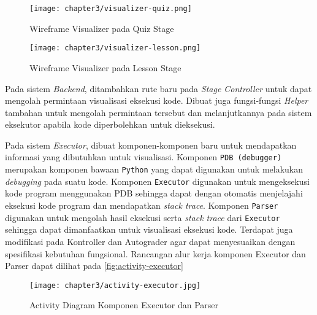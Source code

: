\begin{figure}[H]
  \centering
  \texttt{[image: chapter3/visualizer-quiz.png]}
  \caption{Wireframe Visualizer pada Quiz Stage} \label{fig:wireframe-quiz}
\end{figure}

\begin{figure}[H]
  \centering
  \texttt{[image: chapter3/visualizer-lesson.png]}
  \caption{Wireframe Visualizer pada Lesson Stage} \label{fig:wireframe-lesson}
\end{figure}

Pada sistem \textit{Backend}, ditambahkan rute baru pada \textit{Stage Controller} untuk dapat mengolah permintaan visualisasi eksekusi kode. Dibuat juga fungsi-fungsi \textit{Helper} tambahan untuk mengolah permintaan tersebut dan melanjutkannya pada sistem eksekutor apabila kode diperbolehkan untuk dieksekusi.

Pada sistem \textit{Executor}, dibuat komponen-komponen baru untuk mendapatkan informasi yang dibutuhkan untuk visualisasi. Komponen \verb|PDB (debugger)| merupakan komponen bawaan \verb|Python| yang dapat digunakan untuk melakukan \textit{debugging} pada suatu kode. Komponen \verb|Executor| digunakan untuk mengeksekusi kode program menggunakan PDB sehingga dapat dengan otomatis menjelajahi eksekusi kode program dan mendapatkan \textit{stack trace}. Komponen \verb|Parser| digunakan untuk mengolah hasil eksekusi serta \textit{stack trace} dari \verb|Executor| sehingga dapat dimanfaatkan untuk visualisasi eksekusi kode. Terdapat juga modifikasi pada Kontroller dan Autograder agar dapat menyesuaikan dengan spesifikasi kebutuhan fungsional. Rancangan alur kerja komponen Executor dan Parser dapat dilihat pada \autoref{fig:activity-executor}

\begin{figure}[H]
  \centering
  \texttt{[image: chapter3/activity-executor.jpg]}
  \caption{Activity Diagram Komponen Executor dan Parser} \label{fig:activity-executor}
\end{figure}